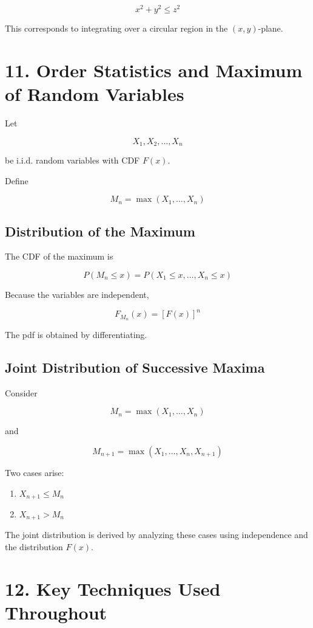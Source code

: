 \documentclass[12pt]{article}
\begin{document}
\[
x^2+y^2 \le z^2
\]

This corresponds to integrating over a circular region in the $(x,y)$-plane.

\section*{11. Order Statistics and Maximum of Random Variables}

Let

\[
X_1, X_2, \dots, X_n
\]

be i.i.d. random variables with CDF $F(x)$.

Define

\[
M_n = \max(X_1,\dots,X_n)
\]

\subsection*{Distribution of the Maximum}

The CDF of the maximum is

\[
P(M_n \le x)
=
P(X_1\le x, \dots, X_n\le x)
\]

Because the variables are independent,

\[
F_{M_n}(x) = [F(x)]^n
\]

The pdf is obtained by differentiating.

\subsection*{Joint Distribution of Successive Maxima}

Consider

\[
M_n=\max(X_1,\dots,X_n)
\]

and

\[
M_{n+1}=\max(X_1,\dots,X_n,X_{n+1})
\]

Two cases arise:

\begin{enumerate}
\item $X_{n+1} \le M_n$
\item $X_{n+1} > M_n$
\end{enumerate}

The joint distribution is derived by analyzing these cases using independence and the distribution $F(x)$.

\section*{12. Key Techniques Used Throughout}
\end{document}
